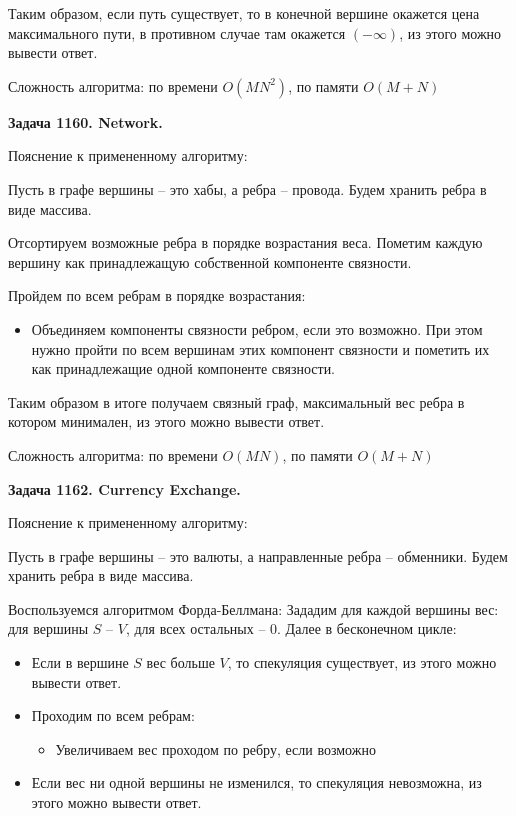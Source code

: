 \documentclass[12pt,a4paper]{article}
\begin{document}
    Таким образом, если путь существует, то в конечной вершине окажется цена максимального пути,
    в противном случае там окажется $(-\infty)$, из этого можно вывести ответ.

    Сложность алгоритма: по времени $O(MN^2)$, по памяти $O(M+N)$

    \bigskip

    \textbf{Задача 1160. Network.}

    Пояснение к примененному алгоритму:

    Пусть в графе вершины -- это хабы, а ребра -- провода.
    Будем хранить ребра в виде массива.

    Отсортируем возможные ребра в порядке возрастания веса.
    Пометим каждую вершину как принадлежащую собственной компоненте связности.

    Пройдем по всем ребрам в порядке возрастания:
    \begin{itemize}
        \item Объединяем компоненты связности ребром, если это возможно.
        При этом нужно пройти по всем вершинам этих компонент связности и пометить их как
        принадлежащие одной компоненте связности.
    \end{itemize}

    Таким образом в итоге получаем связный граф, максимальный вес ребра в котором минимален,
    из этого можно вывести ответ.

    Сложность алгоритма: по времени $O(MN)$, по памяти $O(M+N)$

    \bigskip

    \textbf{Задача 1162. Currency Exchange.}

    Пояснение к примененному алгоритму:

    Пусть в графе вершины -- это валюты, а направленные ребра -- обменники.
    Будем хранить ребра в виде массива.

    Воспользуемся алгоритмом Форда-Беллмана:
    Зададим для каждой вершины вес: для вершины $S$ -- $V$, для всех остальных -- $0$.
    Далее в бесконечном цикле:
    \begin{itemize}
        \item Если в вершине $S$ вес больше $V$, то спекуляция существует, из этого можно вывести ответ.
        \item Проходим по всем ребрам:
        \begin{itemize}
            \item Увеличиваем вес проходом по ребру, если возможно
        \end{itemize}
        \item Если вес ни одной вершины не изменился, то спекуляция невозможна, из этого можно вывести ответ.
    \end{itemize}
\end{document}
